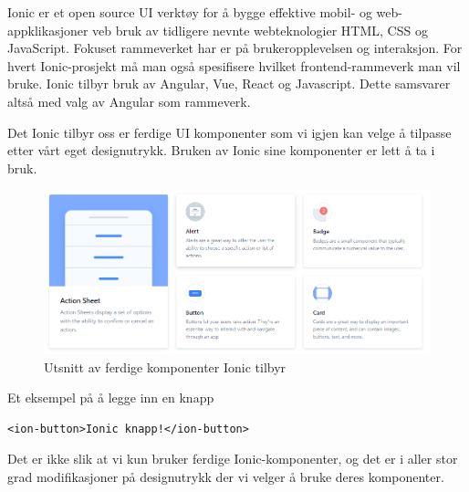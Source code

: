 
Ionic er et open source UI verktøy for å bygge effektive mobil- og web-appklikasjoner veb bruk av tidligere nevnte webteknologier HTML, CSS og JavaScript. Fokuset rammeverket har er på brukeropplevelsen og interaksjon. For hvert Ionic-prosjekt må man også spesifisere hvilket frontend-rammeverk man vil bruke. Ionic tilbyr bruk av Angular, Vue, React og Javascript. Dette samsvarer altså med valg av Angular som rammeverk.

Det Ionic tilbyr oss er ferdige UI komponenter som vi igjen kan velge å tilpasse etter vårt eget designutrykk. Bruken av Ionic sine komponenter er lett å ta i bruk. 

\begin{figure}[H] 
    \centering
    \includegraphics[width=\textwidth]{figures/Tekniske-valg/Ionic/Ionic-Components.PNG}
    \caption{Utsnitt av ferdige komponenter Ionic tilbyr}
\end{figure}

Et eksempel på å legge inn en knapp
\begin{lstlisting}
<ion-button>Ionic knapp!</ion-button>
\end{lstlisting}


Det er ikke slik at vi kun bruker ferdige Ionic-komponenter, og det er i aller stor grad modifikasjoner på designutrykk der vi velger å bruke deres komponenter. 

